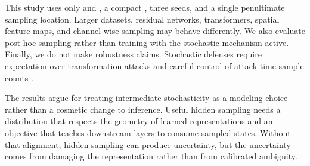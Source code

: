 This study uses only \mnist and \fashionmnist, a compact \cnn, three seeds, and a single penultimate sampling location. Larger datasets, residual networks, transformers, spatial feature maps, and channel-wise sampling may behave differently. We also evaluate post-hoc sampling rather than training with the stochastic mechanism active. Finally, we do not make robustness claims. Stochastic defenses require expectation-over-transformation attacks and careful control of attack-time sample counts \cite{daubener2022sampling}.

The results argue for treating intermediate stochasticity as a modeling choice rather than a cosmetic change to inference. Useful hidden sampling needs a distribution that respects the geometry of learned representations and an objective that teaches downstream layers to consume sampled states. Without that alignment, hidden sampling can produce uncertainty, but the uncertainty comes from damaging the representation rather than from calibrated ambiguity.
